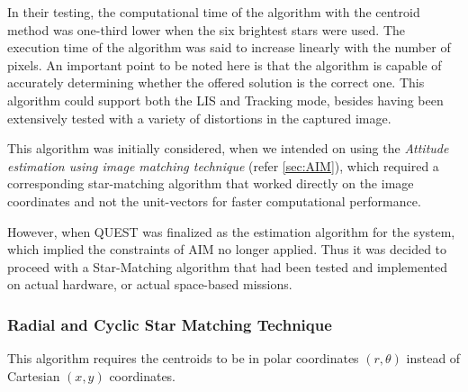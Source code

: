 In their testing, the computational time of the algorithm with the centroid method was one-third lower when the six brightest stars were used. The execution time of the algorithm was said to increase linearly with the number of pixels.
An important point to be noted here is that the algorithm is capable of accurately determining whether the offered solution is the correct one.
This algorithm could support both the LIS and Tracking mode, besides having been extensively tested with a variety of distortions in the captured image.

This algorithm was initially considered, when we intended on using the \textit{Attitude estimation using image matching technique} (refer \ref{sec:AIM}), which required a corresponding star-matching  algorithm that worked directly on the image coordinates and not the unit-vectors for faster computational performance. 

However, when QUEST was finalized as the estimation algorithm for the system, which implied the constraints of AIM no longer applied. Thus it was decided to proceed with a Star-Matching algorithm that had been tested and implemented on actual hardware, or actual space-based missions.


\subsubsection{Radial and Cyclic Star Matching Technique}

This algorithm \cite{zhang2008full} requires the centroids to be in polar coordinates $(r, \theta)$ instead of Cartesian $(x, y)$ coordinates.

